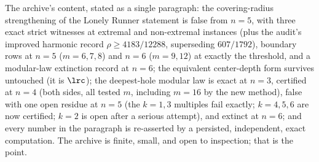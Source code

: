 The archive's content, stated as a single paragraph: the
covering-radius strengthening of the Lonely Runner statement is false
from $n=5$, with three exact strict witnesses at extremal and
non-extremal instances (plus the audit's improved harmonic record
$\rho\ge4183/12288$, superseding $607/1792$), boundary rows at
$n=5$ ($m=6,7,8$) and $n=6$ ($m=9,12$) at exactly the threshold, and a
modular-law extinction record at $n=6$; the equivalent
center-depth form survives untouched (it is $\lrc$); the deepest-hole
modular law is exact at $n=3$, certified at $n=4$ (both sides, all
tested $m$, including $m=16$ by the new method), false with one open
residue at $n=5$ (the $k=1,3$ multiples fail exactly; $k=4,5,6$ are now
certified; $k=2$ is open after a serious attempt), and extinct at $n=6$; and every number in the paragraph is
re-asserted by a persisted, independent, exact computation. The archive
is finite, small, and open to inspection; that is the point.
